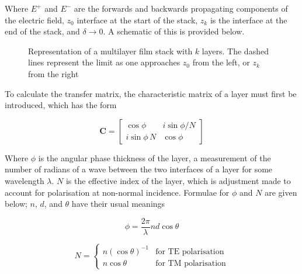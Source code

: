 \documentclass[10pt,a4paper,portrait]{report}
\begin{document}
\noindent
Where $E^+$ and $E^-$ are the forwards and backwards propagating components of the electric field, $z_0$ interface at the start of the stack, $z_k$ is the interface at the end of the stack, and $\delta \rightarrow 0$.
A schematic of this is provided below.

\vspace*{3mm}
\begin{figure}[H]
\label{multilayer-stack-interfaces}
\begin{center}
\centering
\def\svgwidth{4in}

\end{center}
\vspace*{-5mm}
\caption{Representation of a multilayer film stack with $k$ layers. The dashed lines represent the limit as one approaches $z_0$ from the left, or $z_k$ from the right}
\end{figure}%

\noindent
To calculate the transfer matrix, the characteristic matrix of a layer must first be introduced, which has the form

\begin{equation}
\label{eq:characteristic-matrix}
\mathbf{C} = 
\begin{bmatrix}
  \cos\phi         & i \sin \phi / N \\
  i \sin \phi \, N & \cos\phi
\end{bmatrix}
\end{equation}

\noindent
Where $\phi$ is the angular phase thickness of the layer, a measurement of the number of radians of a wave between the two interfaces of a layer for some wavelength $\lambda$.
$N$ is the effective index of the layer, which is adjustment made to account for polarisation at non-normal incidence. Formulae for $\phi$ and $N$ are given below; $n$, $d$, and $\theta$ have their usual meanings

\begin{equation}\label{angular-phase-thickness}
\phi = \frac{2\pi}{\lambda} nd \cos\theta
\end{equation}

\begin{equation}\label{effective-index}
N = 
\begin{cases}
  n\left(\cos\theta\right)^{-1} & \mbox{for TE polarisation} \\
  n\cos\theta      & \mbox{for TM polarisation}
\end{cases}
\end{equation}
\end{document}
